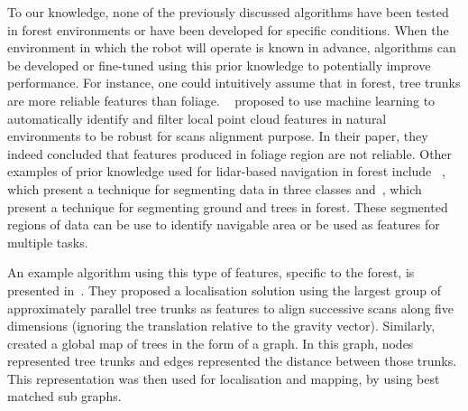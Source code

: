 
To our knowledge, none of the previously discussed algorithms have been tested in forest environments or have been developed for specific conditions. When the environment in which the robot will operate is known in advance, algorithms can be developed or fine-tuned using this prior knowledge to potentially improve performance. For instance, one could intuitively assume that in forest, tree trunks are more reliable features than foliage. ~\citet{Latulippe2013} proposed to use machine learning to automatically identify and filter local point cloud features in natural environments to be robust for scans alignment purpose. In their paper, they indeed concluded that features produced in foliage region are not reliable. Other examples of prior knowledge used for \gls*{lidar}-based navigation in forest include ~\citep{Lalonde2006}, which present a technique for segmenting data in three classes and~\citep{Mcdaniel2012}, which present a technique for segmenting ground and trees in forest. These segmented regions of data can be use to identify navigable area or be used as features for multiple tasks.

An example algorithm using this type of features, specific to the forest, is presented in~\citet{Song2012}. They proposed a localisation solution using the largest group of approximately parallel tree trunks as features to align successive scans along five dimensions (ignoring the translation relative to the gravity vector). Similarly, \citet{Miettinen2007} created a global map of trees in the form of a graph. In this graph, nodes represented tree trunks and edges represented the distance between those trunks. This representation was then used for localisation and mapping, by using best matched sub graphs.

